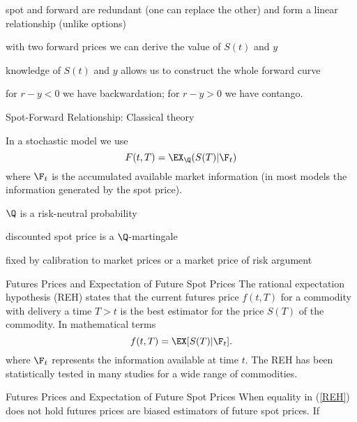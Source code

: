 {%



	spot and forward are redundant (one can replace the other) and form a
linear relationship (unlike options)

	with two forward prices we can derive the value of $S(t)$ and $y$

	knowledge of $S(t)$ and $y$ allows us to construct the whole forward curve

	for $r-y <0$ we have backwardation; for $r-y>0$ we have contango.






{Spot-Forward Relationship: Classical theory}






	In a stochastic model we use
$$
F(t,T)=\EX_{\Q}(S(T)|\F_t)
$$
where $\F_t$ is the accumulated available market information (in most models the information generated by the spot price).

	$\Q$ is a risk-neutral probability






	discounted spot price is a $\Q$-martingale

	fixed by calibration to market prices or a market price of risk argument











{Futures Prices and Expectation of Future Spot Prices}
The rational expectation hypothesis (REH) states that the current futures price $f(t,T)$ for a commodity with
delivery a time $T>t$ is the best estimator for the price $S(T)$ of the commodity.
In mathematical terms
\begin{equation}\label{REH}
f(t,T) = \EX[S(T) |\F_t].
\end{equation}
where $\F_t$ represents the information available at time $t$. The REH has been statistically
tested in many studies for a wide range of commodities.

{Futures Prices and Expectation of Future Spot Prices}
When equality in (\ref{REH}) does not hold futures prices are biased estimators of
future spot prices. If



}
